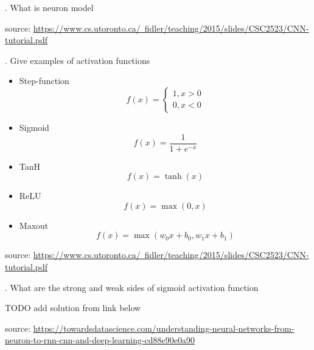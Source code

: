 \documentclass{article}
\newcounter{question}
\begin{document}
\newcommand\Que[1]{%
    
    \leavevmode\par
   \noindent
   \thequestion. \Large #1\par}

\Que{What is neuron model}

\small source: \href{https://www.cs.utoronto.ca/~fidler/teaching/2015/slides/CSC2523/CNN-tutorial.pdf}{https://www.cs.utoronto.ca/~fidler/teaching/2015/slides/CSC2523/CNN-tutorial.pdf}

\Que{Give examples of activation functions}

\begin{itemize}
    \item Step-function $$f(x)=\begin{cases} 1, x>0 \\ 0,  x<0 \end{cases}$$
    \item Sigmoid $$f(x)=\frac{1}{1+e^{-x}}$$
    \item TanH $$ f(x)=\tanh(x)$$
    \item ReLU $$f(x)=\max(0,x)$$
    \item Maxout $$f(x) = \max(w_0x + b_0, w_1x + b_1)$$
\end{itemize}
\small source: \href{https://www.cs.utoronto.ca/~fidler/teaching/2015/slides/CSC2523/CNN-tutorial.pdf}{https://www.cs.utoronto.ca/~fidler/teaching/2015/slides/CSC2523/CNN-tutorial.pdf}

\Que{What are the strong and weak sides of sigmoid activation function}

TODO add solution from link below

\small source: \href{https://towardsdatascience.com/understanding-neural-networks-from-neuron-to-rnn-cnn-and-deep-learning-cd88e90e0a90}{https://towardsdatascience.com/understanding-neural-networks-from-neuron-to-rnn-cnn-and-deep-learning-cd88e90e0a90}
\end{document}
